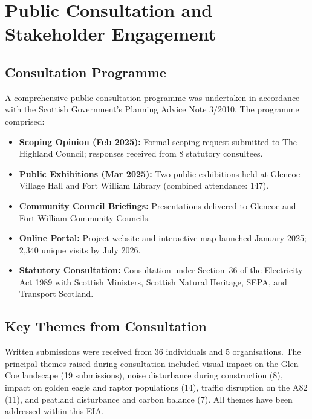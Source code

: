 \section{Public Consultation and Stakeholder Engagement}

\subsection{Consultation Programme}
A comprehensive public consultation programme was undertaken in accordance with the Scottish Government's Planning Advice Note 3/2010. The programme comprised:

\begin{itemize}
  \item \textbf{Scoping Opinion (Feb 2025):} Formal scoping request submitted to The Highland Council; responses received from 8 statutory consultees.
  \item \textbf{Public Exhibitions (Mar 2025):} Two public exhibitions held at Glencoe Village Hall and Fort William Library (combined attendance: 147).
  \item \textbf{Community Council Briefings:} Presentations delivered to Glencoe and Fort William Community Councils.
  \item \textbf{Online Portal:} Project website and interactive map launched January 2025; 2,340 unique visits by July 2026.
  \item \textbf{Statutory Consultation:} Consultation under Section~36 of the Electricity Act 1989 with Scottish Ministers, Scottish Natural Heritage, SEPA, and Transport Scotland.
\end{itemize}

\subsection{Key Themes from Consultation}
Written submissions were received from 36 individuals and 5 organisations. The principal themes raised during consultation included visual impact on the Glen Coe landscape (19 submissions), noise disturbance during construction (8), impact on golden eagle and raptor populations (14), traffic disruption on the A82 (11), and peatland disturbance and carbon balance (7). All themes have been addressed within this EIA.

